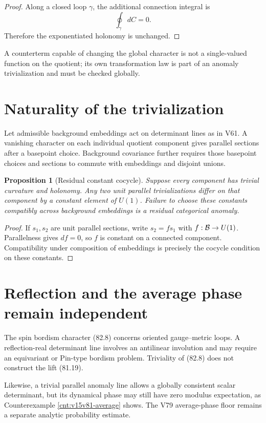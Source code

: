 \documentclass[11pt]{article}
\newtheorem{proposition}[theorem]{Proposition}
\theoremstyle{remark}
\begin{document}
\begin{proof}
Along a closed loop \(\gamma\), the additional connection integral
is
\[
 \oint_\gamma dC=0.
\]
Therefore the exponentiated holonomy is unchanged.
\end{proof}

A counterterm capable of changing the global character is not a
single-valued function on the quotient; its own transformation law
is part of an anomaly trivialization and must be checked globally.

\section{Naturality of the trivialization}

Let admissible background embeddings act on determinant lines as
in V61.  A vanishing character on each individual quotient
component gives parallel sections after a basepoint choice.
Background covariance further requires those basepoint choices and
sections to commute with embeddings and disjoint unions.

\begin{proposition}[Residual constant cocycle]
\label{prop:v15v82-natural}
Suppose every component has trivial curvature and holonomy.  Any
two unit parallel trivializations differ on that component by a
constant element of \(U(1)\).  Failure to choose these constants
compatibly across background embeddings is a residual categorical
anomaly.
\end{proposition}

\begin{proof}
If \(s_1,s_2\) are unit parallel sections, write
\(s_2=fs_1\) with \(f:{\cal B}\to U(1)\).  Parallelness gives
\(df=0\), so \(f\) is constant on a connected component.
Compatibility under composition of embeddings is precisely the
cocycle condition on these constants.
\end{proof}

\section{Reflection and the average phase remain independent}

The spin bordism character (82.8) concerns oriented gauge--metric
loops.  A reflection-real determinant line involves an antilinear
involution and may require an equivariant or Pin-type bordism
problem.  Triviality of (82.8) does not construct the lift (81.19).

Likewise, a trivial parallel anomaly line allows a globally
consistent scalar determinant, but its dynamical phase may still
have zero modulus expectation, as Counterexample
\ref{cnt:v15v81-average} shows.  The V79 average-phase floor remains
a separate analytic probability estimate.
\end{document}
